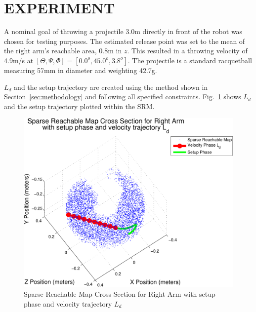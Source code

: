 \section{EXPERIMENT}
A nominal goal of throwing a projectile 3.0m directly in front of the robot was chosen for testing purposes.  The estimated release point was set to the mean of the right arm's reachable area, 0.8m in $z$.  This resulted in a throwing velocity of 4.9m/s at $[\Theta, \Psi, \Phi] =[0.0^o,45.0^o, 3.8^o]$.  The projectile is a standard racquetball measuring 57mm in diameter and weighting 42.7g.

$L_d$ and the setup trajectory are created using the method shown in Section~\ref{sec:methodology} and following all specified constraints.  Fig.~\ref{fig:3dThrowPlot1} shows $L_d$ and the setup trajectory plotted within the SRM.

\begin{figure}[thpb]
  \centering
\includegraphics[width=1.0\columnwidth]{./MATLAB/throwTraj3D.pdf}
  \caption{Sparse Reachable Map Cross Section for Right Arm with setup phase and velocity trajectory $L_d$ }
  \label{fig:3dThrowPlot1}
\end{figure}


